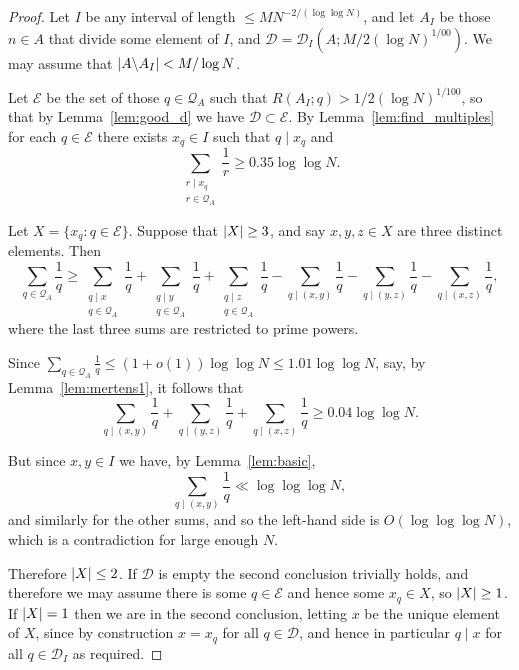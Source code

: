 \begin{proof}
Let $I$ be any interval of length $\leq MN^{-2/(\log\log N)}$, and let $A_I$ be those $n\in A$ that divide some element of $I$, and $\mathcal{D}=\mathcal{D}_I(A;M/2(\log N)^{1/00})$. We may assume that $\left\lvert A\backslash A_I\right\rvert< M/\log N$.

Let $\mathcal{E}$ be the set of those $q\in\mathcal{Q}_A$ such that $R(A_I;q)> 1/2(\log N)^{1/100}$, so that by Lemma~\ref{lem:good_d} we have $\mathcal{D}\subset \mathcal{E}$. By Lemma~\ref{lem:find_multiples} for each $q\in\mathcal{E}$ there exists $x_q\in I$ such that $q\mid x_q$ and
\[\sum_{\substack{r\mid x_q\\ r\in \mathcal{Q}_A}}\frac{1}{r}\geq 0.35\log\log N.\]


Let $X=\{x_q : q\in \mathcal{E}\}$. Suppose that $\left\lvert X\right\rvert\geq 3$, and say $x,y,z\in X$ are three distinct elements. Then
\[\sum_{q\in\mathcal{Q}_A}\frac{1}{q}\geq \sum_{\substack{q\mid x\\ q\in \mathcal{Q}_A}}\frac{1}{q}+\sum_{\substack{q\mid y\\ q\in \mathcal{Q}_A}}\frac{1}{q}+\sum_{\substack{q\mid z\\ q\in \mathcal{Q}_A}}\frac{1}{q}-\sum_{q\mid (x,y)}\frac{1}{q}-\sum_{q\mid (y,z)}\frac{1}{q}-\sum_{q\mid (x,z)}\frac{1}{q},\]
where the last three sums are restricted to prime powers.

Since $\sum_{q\in\mathcal{Q}_A}\frac{1}{q}\leq (1+o(1))\log\log N\leq 1.01\log\log N$, say, by Lemma~\ref{lem:mertens1}, it follows that
\[\sum_{q\mid (x,y)}\frac{1}{q}+\sum_{q\mid (y,z)}\frac{1}{q}+\sum_{q\mid (x,z)}\frac{1}{q}\geq 0.04\log\log N.\]

But since $x,y\in I$ we have, by Lemma~\ref{lem:basic},
  \[\sum_{q\mid (x,y)}\frac{1}{q}\ll \log\log\log N,\]
and similarly for the other sums, and so the left-hand side is $O(\log\log\log N)$, which is a contradiction for large enough $N$.

Therefore $\left\lvert X\right\rvert\leq 2$. If $\mathcal{D}$ is empty the second conclusion trivially holds, and therefore we may assume there is some $q\in \mathcal{E}$ and hence some $x_q\in X$, so $\left\lvert X\right\rvert\geq 1$. If $\left\lvert X\right\rvert=1$ then we are in the second conclusion, letting $x$ be the unique element of $X$, since by construction $x=x_q$ for all $q\in \mathcal{D}$, and hence in particular $q\mid x$ for all $q\in \mathcal{D}_I$ as required.


\end{proof}
